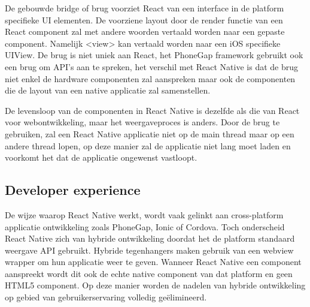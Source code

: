 De gebouwde bridge of brug voorziet React van een interface in de platform specifieke UI elementen. De voorziene layout door de render functie van een React component zal met andere woorden vertaald worden naar een gepaste component. Namelijk <view> kan vertaald worden naar een iOS specifieke UIView. De brug is niet uniek aan React, het PhoneGap framework gebruikt ook een brug om API’s aan te spreken, het verschil met React Native is dat de brug niet enkel de hardware componenten zal aanspreken maar ook de componenten die de layout van een native applicatie zal samenstellen.

De levensloop van de componenten in React Native is dezelfde als die van React voor webontwikkeling, maar het weergaveproces is anders. Door de brug te gebruiken, zal een React Native applicatie niet op de main thread maar op een andere thread lopen, op deze manier zal de applicatie niet lang moet laden en voorkomt het dat de applicatie ongewenst vastloopt.

\subsection{Developer experience}

De wijze waarop React Native werkt, wordt vaak gelinkt aan cross-platform applicatie ontwikkeling zoals PhoneGap, Ionic of Cordova. Toch onderscheid React Native zich van hybride ontwikkeling doordat het de platform standaard weergave API gebruikt. Hybride tegenhangers maken gebruik van een webview wrapper om hun applicatie weer te geven. Wanneer React Native een component aanspreekt wordt dit ook de echte native component van dat platform en geen HTML5 component. Op deze manier worden de nadelen van hybride ontwikkeling op gebied van gebruikerservaring volledig geëlimineerd.  

